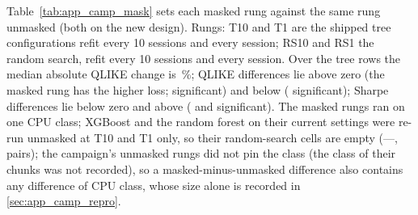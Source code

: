Table~\ref{tab:app_camp_mask} sets each masked rung against the same rung unmasked (both
on the new design). Rungs: T10 and T1 are the shipped tree configurations refit every 10
sessions and every session; RS10 and RS1 the random search, refit every 10 sessions and
every session. Over the \campMaskTreeN{}
tree rows the median absolute QLIKE change is \campMaskMedAbsQ\,\%; \campMaskTreeQAbove{}
QLIKE differences lie above zero (the masked rung has the higher loss;
\campMaskTreeQAboveSig{} significant) and \campMaskTreeQBelow{} below
(\campMaskTreeQBelowSig{} significant); \campMaskTreeSBelow{} Sharpe differences lie below
zero and \campMaskTreeSAbove{} above (\campMaskTreeSBelowSig{} and
\campMaskTreeSAboveSig{} significant). The masked
rungs ran on one CPU class;
XGBoost and the random forest on their current settings were re-run unmasked at T10 and T1
only, so their random-search cells are empty (---, \campMaskDroppedN{} pairs);
the campaign's unmasked rungs did not pin the class (the class of their chunks was not
recorded), so a
masked-minus-unmasked difference also contains any difference of CPU class, whose size alone
is recorded in \ref{sec:app_camp_repro}.

